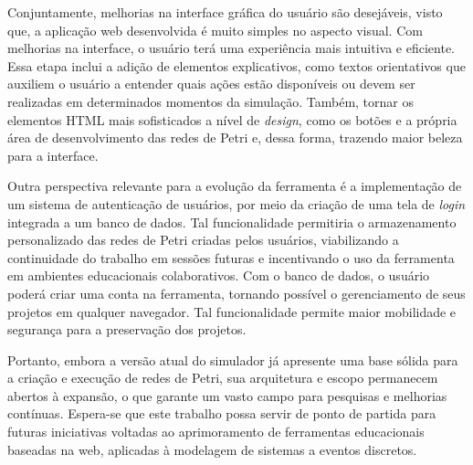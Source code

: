 \documentclass[
	12pt,				%
	openright,			%
	oneside,			%
	a4paper,			%
	english,			%
	brazil				%
	]{abntex2}
\begin{document}
Conjuntamente, melhorias na interface gráfica do usuário são desejáveis, visto que, a aplicação web desenvolvida é muito simples no aspecto visual. Com melhorias na interface, o usuário terá uma experiência mais intuitiva e eficiente. Essa etapa inclui a adição de elementos explicativos, como textos orientativos que auxiliem o usuário a entender quais ações estão disponíveis ou devem ser realizadas em determinados momentos da simulação. Também, tornar os elementos HTML mais sofisticados a nível de \textit{design}, como os botões e a própria área de desenvolvimento das redes de Petri e, dessa forma, trazendo maior beleza para a interface.

Outra perspectiva relevante para a evolução da ferramenta é a implementação de um sistema de autenticação de usuários, por meio da criação de uma tela de \textit{login} integrada a um banco de dados. Tal funcionalidade permitiria o armazenamento personalizado das redes de Petri criadas pelos usuários, viabilizando a continuidade do trabalho em sessões futuras e incentivando o uso da ferramenta em ambientes educacionais colaborativos. Com o banco de dados, o usuário poderá criar uma conta na ferramenta, tornando possível o gerenciamento de seus projetos em qualquer navegador. Tal funcionalidade permite maior mobilidade e segurança para a preservação dos projetos. 

Portanto, embora a versão atual do simulador já apresente uma base sólida para a criação e execução de redes de Petri, sua arquitetura e escopo permanecem abertos à expansão, o que garante um vasto campo para pesquisas e melhorias contínuas. Espera-se que este trabalho possa servir de ponto de partida para futuras iniciativas voltadas ao aprimoramento de ferramentas educacionais baseadas na web, aplicadas à modelagem de sistemas a eventos discretos.





\end{document}
